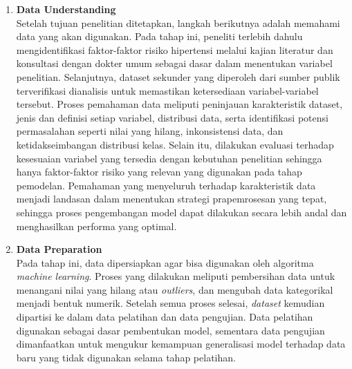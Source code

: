 \begin{enumerate}
\item \textbf{Data Understanding}\\
Setelah tujuan penelitian ditetapkan, langkah berikutnya adalah memahami data yang akan digunakan. Pada tahap ini, peneliti terlebih dahulu mengidentifikasi faktor-faktor risiko hipertensi melalui kajian literatur dan konsultasi dengan dokter umum sebagai dasar dalam menentukan variabel penelitian. Selanjutnya, dataset sekunder yang diperoleh dari sumber publik terverifikasi dianalisis untuk memastikan ketersediaan variabel-variabel tersebut. Proses pemahaman data meliputi peninjauan karakteristik dataset, jenis dan definisi setiap variabel, distribusi data, serta identifikasi potensi permasalahan seperti nilai yang hilang, inkonsistensi data, dan ketidakseimbangan distribusi kelas. Selain itu, dilakukan evaluasi terhadap kesesuaian variabel yang tersedia dengan kebutuhan penelitian sehingga hanya faktor-faktor risiko yang relevan yang digunakan pada tahap pemodelan. Pemahaman yang menyeluruh terhadap karakteristik data menjadi landasan dalam menentukan strategi prapemrosesan yang tepat, sehingga proses pengembangan model dapat dilakukan secara lebih andal dan menghasilkan performa yang optimal.


\item \textbf{Data Preparation}\\
Pada tahap ini, data dipersiapkan agar bisa digunakan oleh algoritma \textit{machine learning}. Proses yang dilakukan meliputi pembersihan data untuk menangani nilai yang hilang atau \textit{outliers}, dan mengubah data kategorikal menjadi bentuk numerik. Setelah semua proses selesai, \textit{dataset} kemudian dipartisi ke dalam data pelatihan dan data pengujian. Data pelatihan digunakan sebagai dasar pembentukan model, sementara data pengujian dimanfaatkan untuk mengukur kemampuan generalisasi model terhadap data baru yang tidak digunakan selama tahap pelatihan.


\end{enumerate}
